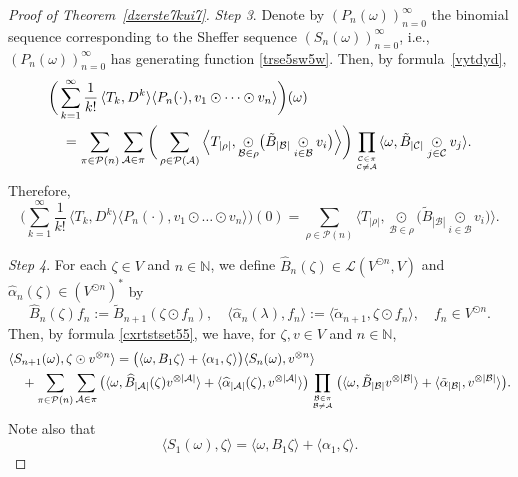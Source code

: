 \documentclass[12pt]{article}
\theoremstyle{remark}
\theoremstyle{remark}
\theoremstyle{remark}
\begin{document}
\begin{proof}[Proof of Theorem~\ref{dzerste7kui7}]
{\it Step 3}. Denote by $(P_n(\omega))_{n=0}^\infty$ the binomial sequence corresponding to the Sheffer sequence $(S_n(\omega))_{n=0}^\infty$, i.e., $(P_n(\omega))_{n=0}^\infty$ has generating function \eqref{trse5sw5w}. Then, by formula~\eqref{vytdyd}, 
\begin{align}
&\bigg(\sum_{k=1}^\infty \frac 1{k!}\,\langle T_k, D^{k}\rangle\langle P_n(\cdot),v_1\odot\dots\odot v_n\rangle\bigg)(\omega)\notag\\ 
&\quad=\sum_{\pi\in\mathcal P(n)}\sum_{\mathcal A\in\pi}
\bigg(\sum_{\rho\in\mathcal P(\mathcal A)}\Big\langle T_{|\rho|},\underset{\mathcal B\in\rho}{\odot}\big(\tilde B_{|\mathcal B|}\underset{i\in\mathcal B}\odot v_i\big)\Big\rangle \bigg)
\prod_{{\mathcal C\in\pi}\atop{\mathcal C\ne\mathcal A}}\langle\omega,\tilde B_{|\mathcal C|}\underset{j\in\mathcal C}\odot v_j \rangle.\notag
\end{align}
Therefore,
\begin{equation}\label{fdre654w6}
\bigg(\sum_{k=1}^\infty \frac 1{k!}\,\langle T_k, D^{k}\rangle\langle P_n(\cdot),v_1\odot\dots\odot v_n\rangle\bigg)(0)= \sum_{\rho\in\mathcal P(n)}\Big\langle T_{|\rho|},\underset{\mathcal B\in\rho}{\odot}\big(\tilde B_{|\mathcal B|}\underset{i\in\mathcal B}\odot v_i\big)\Big\rangle .
\end{equation}



{\it Step 4}. 
For each $\zeta\in V$ and $n\in\mathbb N$, we define $\widehat B_{n}(\zeta)\in\mathcal L(V^{\odot n},V)$ and $\widehat\alpha_{n}(\zeta)\in (V^{\odot n})^*$ by 
\begin{equation}\label{dy6de6ir5}
\widehat B_{n}(\zeta)f_n:=\tilde B_{n+1}(\zeta\odot f_n),\quad \langle\widehat\alpha_{n}(\lambda),f_n\rangle:=\langle\tilde\alpha_{n+1},\zeta\odot f_n\rangle,\quad f_n\in V^{\odot n}.
\end{equation}
Then, by formula \eqref{cxrtstset55}, we have, for $\zeta,v\in V$ and $n\in\mathbb N$,
\begin{align}
&\langle S_{n+1}(\omega),\zeta\odot v^{\otimes n}\rangle=\big(\langle\omega, B_1\zeta\rangle+\langle \alpha_1,\zeta\rangle\big)\langle S_n(\omega),v^{\otimes n}\rangle\notag\\
&\quad+\sum _{\pi\in\mathcal P(n)}\sum_{\mathcal A\in\pi} \big(\langle\omega,\widehat B_{|\mathcal A|}(\zeta)  v^{\otimes|\mathcal A|}\rangle+\langle \widehat\alpha_{|\mathcal A|}(\zeta),v^{\otimes|\mathcal A|}\rangle\big) 
\prod_{{\mathcal B\in\pi}\atop{\mathcal B\ne\mathcal A}}\big(\langle\omega,\tilde B_{|\mathcal B|}v^{\otimes|\mathcal B|}\rangle+\langle\tilde\alpha_{|\mathcal B|},v^{\otimes|\mathcal B|}\rangle\big).\label{cdtre6u}
\end{align}
Note also that
\begin{equation}
\langle S_{1}(\omega),\zeta\rangle= \langle\omega, B_1\zeta\rangle+\langle \alpha_1,\zeta\rangle.\label{vdtrs6ue}
\end{equation}


\end{proof}
\end{document}
